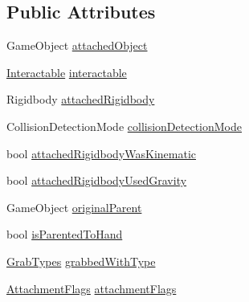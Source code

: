 \subsection*{Public Attributes}
\begin{DoxyCompactItemize}
\item 
Game\+Object \mbox{\hyperlink{struct_valve_1_1_v_r_1_1_interaction_system_1_1_hand_1_1_attached_object_aca7302c98ed109626b3690420a81cf0d}{attached\+Object}}
\item 
\mbox{\hyperlink{class_valve_1_1_v_r_1_1_interaction_system_1_1_interactable}{Interactable}} \mbox{\hyperlink{struct_valve_1_1_v_r_1_1_interaction_system_1_1_hand_1_1_attached_object_afa93283f20acbbec5b6c94b11108adf3}{interactable}}
\item 
Rigidbody \mbox{\hyperlink{struct_valve_1_1_v_r_1_1_interaction_system_1_1_hand_1_1_attached_object_a5fa00853a9e89e28cc0de21ddb8d2455}{attached\+Rigidbody}}
\item 
Collision\+Detection\+Mode \mbox{\hyperlink{struct_valve_1_1_v_r_1_1_interaction_system_1_1_hand_1_1_attached_object_a79e41d83ddc3bbaac6008740ed2c93ae}{collision\+Detection\+Mode}}
\item 
bool \mbox{\hyperlink{struct_valve_1_1_v_r_1_1_interaction_system_1_1_hand_1_1_attached_object_a41a6e37b0c0ad7c78ecef3d61e0a0253}{attached\+Rigidbody\+Was\+Kinematic}}
\item 
bool \mbox{\hyperlink{struct_valve_1_1_v_r_1_1_interaction_system_1_1_hand_1_1_attached_object_a3c9c917e74a9f5caf6f8bb3ae5aaa0ee}{attached\+Rigidbody\+Used\+Gravity}}
\item 
Game\+Object \mbox{\hyperlink{struct_valve_1_1_v_r_1_1_interaction_system_1_1_hand_1_1_attached_object_a7717348a003184d7e43efda581c8db32}{original\+Parent}}
\item 
bool \mbox{\hyperlink{struct_valve_1_1_v_r_1_1_interaction_system_1_1_hand_1_1_attached_object_ac8941fcfdfed2fa636cee612b5fdef07}{is\+Parented\+To\+Hand}}
\item 
\mbox{\hyperlink{namespace_valve_1_1_v_r_1_1_interaction_system_ae03ab84d315f5997fd000817bfb96a0f}{Grab\+Types}} \mbox{\hyperlink{struct_valve_1_1_v_r_1_1_interaction_system_1_1_hand_1_1_attached_object_a3f16314626d46fb6fbbb9cdd8dcbfb68}{grabbed\+With\+Type}}
\item 
\mbox{\hyperlink{class_valve_1_1_v_r_1_1_interaction_system_1_1_hand_a61701f82b8f3fac8818954ec71804cb5}{Attachment\+Flags}} \mbox{\hyperlink{struct_valve_1_1_v_r_1_1_interaction_system_1_1_hand_1_1_attached_object_ae3ee561c8398ec97f75420983d5361ba}{attachment\+Flags}}

\end{DoxyCompactItemize}
